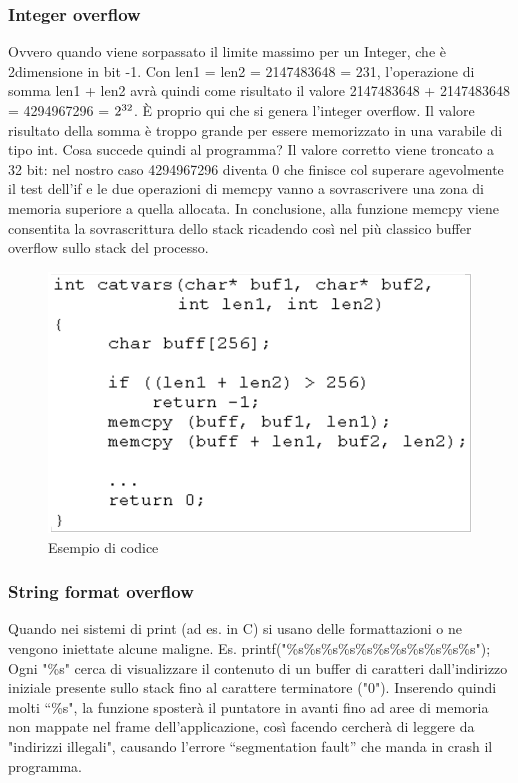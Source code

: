 \documentclass[8pt]{extarticle}
\begin{document}
\subsubsection{Integer overflow}
Ovvero quando viene sorpassato il limite massimo per un Integer, che è 2dimensione in bit -1. 
Con len1 = len2 = 2147483648 = 231, l’operazione di somma len1 + len2 avrà quindi come risultato il 
valore 2147483648 + 2147483648 = 4294967296 = $2\textsuperscript{32}$. È proprio qui che si genera l’integer overflow. 
Il valore risultato della somma è troppo grande per essere memorizzato in una varabile di tipo int. 
Cosa succede quindi al programma? Il valore corretto viene troncato a 32 bit: nel nostro caso 4294967296 
diventa 0 che finisce col superare agevolmente il test dell’if e le due operazioni di memcpy vanno a 
sovrascrivere una zona di memoria superiore a quella allocata. In conclusione, alla funzione memcpy viene 
consentita la sovrascrittura dello stack ricadendo così nel più classico buffer overflow sullo stack del processo.
\begin{figure}[H]
    \center
    \includegraphics[scale=0.2]{images/BO3.png}
    \caption{Esempio di codice}\label{fig:1}
\end{figure}
\subsubsection{String format overflow}
Quando nei sistemi di print (ad es. in C) si usano delle formattazioni o ne vengono iniettate alcune maligne. 
Es. printf("\%s\%s\%s\%s\%s\%s\%s\%s\%s\%s\%s"); Ogni "\%s" cerca di visualizzare il contenuto di un buffer di 
caratteri dall'indirizzo iniziale presente sullo stack fino al carattere terminatore ("0"). Inserendo quindi molti 
“\%s", la funzione sposterà il puntatore in avanti fino ad aree di memoria non mappate nel frame dell'applicazione, 
così facendo cercherà di leggere da "indirizzi illegali", causando l'errore “segmentation fault” che manda in 
crash il programma.
\end{document}
